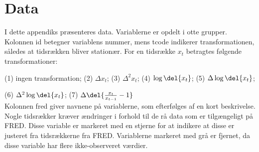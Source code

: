 \chapter{Data} \label{app:app_data}

I dette appendiks præsenteres data. 
Variablerne er opdelt i otte grupper.
Kolonnen id betegner variablens nummer, mens tcode indikerer transformationen, således at tidsrækken bliver stationær. For en tidsrække $x_t$ betragtes følgende transformationer:

(1) ingen transformation; (2) \(\Delta x_t\); (3) \(\Delta^2 x_t\); (4) \(\log \del{x_t}\); (5) \(\Delta \log \del{x_t}\); 

(6) \(\Delta^2 \log \del{x_t}\); (7) \(\Delta \del{\frac{x_t}{x_{t-1}}-1}\) \\[2mm]
%
Kolonnen fred giver navnene på variablerne, som efterfølges af en kort beskrivelse.
Nogle tidsrækker kræver ændringer i forhold til de rå data som er tilgængeligt på FRED.
Disse variable er markeret med en stjerne for at indikere at disse er justeret fra tidsrækkerne fra FRED.
Variablerne markeret med grå er fjernet, da disse variable har flere ikke-observeret værdier.








